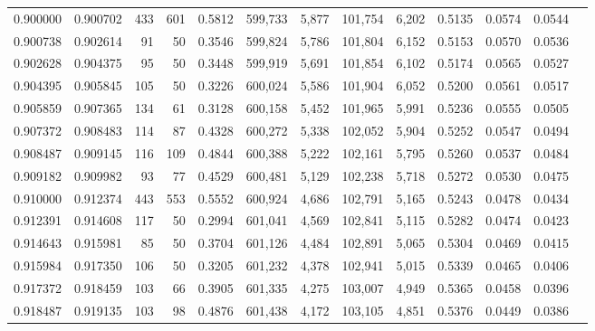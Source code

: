 \begin{tabular}{rrrrrrrrrrrrr}
0.900000 & 0.900702 &   433 & 601 &                                     0.5812 & 599,733 &   5,877 & 101,754 &   6,202 & 0.5135 & 0.0574 & 0.0544 \\
0.900738 & 0.902614 &    91 &  50 &                                     0.3546 & 599,824 &   5,786 & 101,804 &   6,152 & 0.5153 & 0.0570 & 0.0536 \\
0.902628 & 0.904375 &    95 &  50 &                                     0.3448 & 599,919 &   5,691 & 101,854 &   6,102 & 0.5174 & 0.0565 & 0.0527 \\
0.904395 & 0.905845 &   105 &  50 &                                     0.3226 & 600,024 &   5,586 & 101,904 &   6,052 & 0.5200 & 0.0561 & 0.0517 \\
0.905859 & 0.907365 &   134 &  61 &                                     0.3128 & 600,158 &   5,452 & 101,965 &   5,991 & 0.5236 & 0.0555 & 0.0505 \\
0.907372 & 0.908483 &   114 &  87 &                                     0.4328 & 600,272 &   5,338 & 102,052 &   5,904 & 0.5252 & 0.0547 & 0.0494 \\
0.908487 & 0.909145 &   116 & 109 &                                     0.4844 & 600,388 &   5,222 & 102,161 &   5,795 & 0.5260 & 0.0537 & 0.0484 \\
0.909182 & 0.909982 &    93 &  77 &                                     0.4529 & 600,481 &   5,129 & 102,238 &   5,718 & 0.5272 & 0.0530 & 0.0475 \\
0.910000 & 0.912374 &   443 & 553 &                                     0.5552 & 600,924 &   4,686 & 102,791 &   5,165 & 0.5243 & 0.0478 & 0.0434 \\
0.912391 & 0.914608 &   117 &  50 &                                     0.2994 & 601,041 &   4,569 & 102,841 &   5,115 & 0.5282 & 0.0474 & 0.0423 \\
0.914643 & 0.915981 &    85 &  50 &                                     0.3704 & 601,126 &   4,484 & 102,891 &   5,065 & 0.5304 & 0.0469 & 0.0415 \\
0.915984 & 0.917350 &   106 &  50 &                                     0.3205 & 601,232 &   4,378 & 102,941 &   5,015 & 0.5339 & 0.0465 & 0.0406 \\
0.917372 & 0.918459 &   103 &  66 &                                     0.3905 & 601,335 &   4,275 & 103,007 &   4,949 & 0.5365 & 0.0458 & 0.0396 \\
0.918487 & 0.919135 &   103 &  98 &                                     0.4876 & 601,438 &   4,172 & 103,105 &   4,851 & 0.5376 & 0.0449 & 0.0386 \\

\end{tabular}
